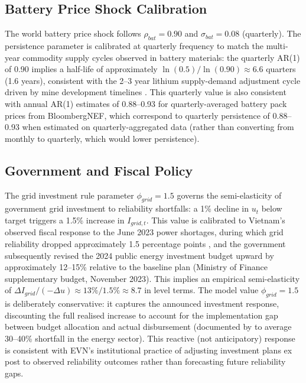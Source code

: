 \documentclass[12pt, a4paper]{article}
\begin{document}
	\subsection{Battery Price Shock Calibration}
	
	The world battery price shock follows $\rho_{bat} = 0.90$ and $\sigma_{bat} = 0.08$ (quarterly). The persistence parameter is calibrated at quarterly frequency to match the multi-year commodity supply cycles observed in battery materials: the quarterly AR(1) of 0.90 implies a half-life of approximately $\ln(0.5)/\ln(0.90) \approx 6.6$ quarters (1.6 years), consistent with the 2--3 year lithium supply-demand adjustment cycle driven by mine development timelines \citep{bloombergnef2023}. This quarterly value is also consistent with annual AR(1) estimates of 0.88--0.93 for quarterly-averaged battery pack prices from BloombergNEF, which correspond to quarterly persistence of 0.88--0.93 when estimated on quarterly-aggregated data (rather than converting from monthly to quarterly, which would lower persistence).
	
	\subsection{Government and Fiscal Policy}
	
	The grid investment rule parameter $\phi_{grid} = 1.5$ governs the semi-elasticity of government grid investment to reliability shortfalls: a 1\% decline in $u_t$ below target triggers a 1.5\% increase in $I_{grid,t}$. This value is calibrated to Vietnam's observed fiscal response to the June 2023 power shortages, during which grid reliability dropped approximately 1.5 percentage points \citep{evn2023}, and the government subsequently revised the 2024 public energy investment budget upward by approximately 12--15\% relative to the baseline plan (Ministry of Finance supplementary budget, November 2023). This implies an empirical semi-elasticity of $\Delta I_{grid}/(-\Delta u) \approx 13\%/1.5\% \approx 8.7$ in level terms. The model value $\phi_{grid} = 1.5$ is deliberately conservative: it captures the announced investment response, discounting the full realised increase to account for the implementation gap between budget allocation and actual disbursement (documented by \citet{worldbank2022} to average 30--40\% shortfall in the energy sector). This reactive (not anticipatory) response is consistent with EVN's institutional practice of adjusting investment plans ex post to observed reliability outcomes rather than forecasting future reliability gaps.
	
\end{document}
